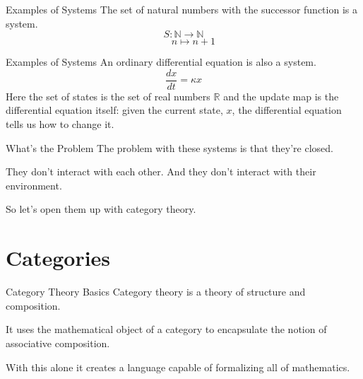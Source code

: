 \documentclass{beamer}
\begin{document}
\begin{frame}{Examples of Systems}
    The set of natural numbers with the successor function is a system.
    \vspace*{0.125in}
    \[
        S: \mathbb{N} \rightarrow \mathbb{N}
    \]
    \[
        \ \ \ \ \ \ \ \ \ n \mapsto n+1
    \]
\end{frame}


\begin{frame}{Examples of Systems}
    An ordinary differential equation is also a system.
    \vspace*{0.125in}
    \[
        \frac{dx}{dt}=\kappa x
    \]
    Here the set of states is the set of real numbers $\mathbb{R}$ and the update map is the differential equation itself: given the current state, $x$, the differential equation tells us how to change it.
\end{frame}


\begin{frame}{What's the Problem}
    The problem with these systems is that they're closed.

    \vspace*{0.125in}
    They don't interact with each other. And they don't interact with their environment.

    \vspace*{0.125in}
    So let's open them up with category theory.
\end{frame}







\section{Categories}

\begin{frame}{Category Theory Basics}
    Category theory is a theory of structure and composition.

    \vspace*{0.25in}
    It uses the mathematical object of a category to encapsulate the notion of associative composition.

    \vspace*{0.25in}
    With this alone it creates a language capable of formalizing all of mathematics.
\end{frame}
\end{document}
